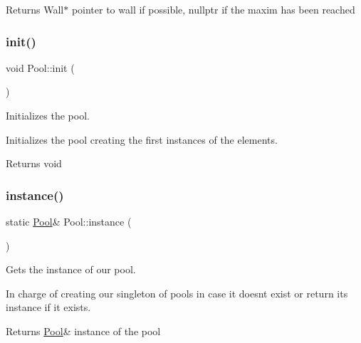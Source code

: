 \begin{DoxyReturn}{Returns}
Wall$\ast$ pointer to wall if possible, nullptr if the maxim has been reached 
\end{DoxyReturn}
\mbox{\label{class_pool_a7b5bfb074b19ea0169edf7c2d73b2f6e}} 
\subsubsection{\texorpdfstring{init()}{init()}}
{\footnotesize\ttfamily void Pool\+::init (\begin{DoxyParamCaption}{ }\end{DoxyParamCaption})}



Initializes the pool. 

Initializes the pool creating the first instances of the elements.

\begin{DoxyReturn}{Returns}
void 
\end{DoxyReturn}
\mbox{\label{class_pool_a20e44e0054d4eedf57f1943b87c06e20}} 
\subsubsection{\texorpdfstring{instance()}{instance()}}
{\footnotesize\ttfamily static \hyperlink{class_pool}{Pool}\& Pool\+::instance (\begin{DoxyParamCaption}{ }\end{DoxyParamCaption})\hspace{0.3cm}{\ttfamily [static]}}



Gets the instance of our pool. 

In charge of creating our singleton of pools in case it doesn\textquotesingle{}t exist or return it\textquotesingle{}s instance if it exists.

\begin{DoxyReturn}{Returns}
\hyperlink{class_pool}{Pool}\& instance of the pool 
\end{DoxyReturn}
\mbox{\label{class_pool_af6234b218a3dd72a440a3381b35c9e36}} 

